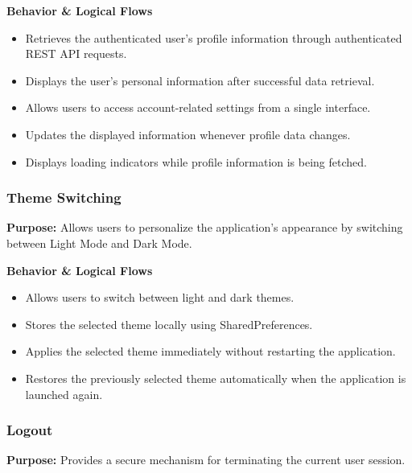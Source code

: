 \vspace{0.2cm}
\noindent\textbf{Behavior \& Logical Flows}

\begin{itemize}
    \item Retrieves the authenticated user's profile information through authenticated REST API requests.
    \item Displays the user's personal information after successful data retrieval.
    \item Allows users to access account-related settings from a single interface.
    \item Updates the displayed information whenever profile data changes.
    \item Displays loading indicators while profile information is being fetched.
\end{itemize}


\subsubsection{Theme Switching}

\textbf{Purpose:}
Allows users to personalize the application's appearance by switching between Light Mode and Dark Mode.

\vspace{0.2cm}
\noindent\textbf{Behavior \& Logical Flows}

\begin{itemize}
    \item Allows users to switch between light and dark themes.
    \item Stores the selected theme locally using SharedPreferences.
    \item Applies the selected theme immediately without restarting the application.
    \item Restores the previously selected theme automatically when the application is launched again.
\end{itemize}


\subsubsection{Logout}

\textbf{Purpose:}
Provides a secure mechanism for terminating the current user session.


